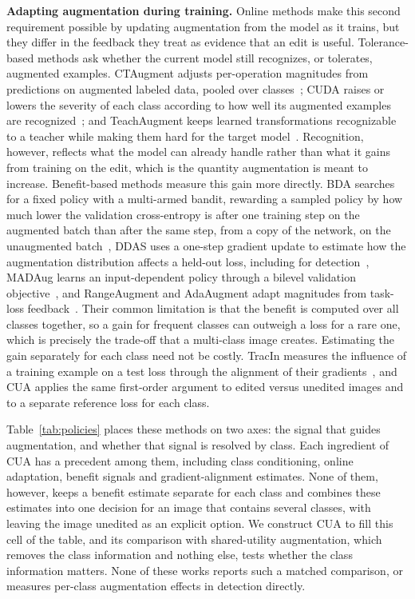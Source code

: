 \documentclass[conference]{IEEEtran}
\begin{document}
\noindent\textbf{Adapting augmentation during training.} Online methods make this second requirement possible by updating augmentation from the model as it trains, but they differ in the feedback they treat as evidence that an edit is useful. Tolerance-based methods ask whether the current model still recognizes, or tolerates, augmented examples. CTAugment adjusts per-operation magnitudes from predictions on augmented labeled data, pooled over classes~\cite{berthelot2020}; CUDA raises or lowers the severity of each class according to how well its augmented examples are recognized~\cite{ahn2023cuda}; and TeachAugment keeps learned transformations recognizable to a teacher while making them hard for the target model~\cite{suzuki2022teach}. Recognition, however, reflects what the model can already handle rather than what it gains from training on the edit, which is the quantity augmentation is meant to increase. Benefit-based methods measure this gain more directly. BDA searches for a fixed policy with a multi-armed bandit, rewarding a sampled policy by how much lower the validation cross-entropy is after one training step on the augmented batch than after the same step, from a copy of the network, on the unaugmented batch~\cite{lu2023bda}, DDAS uses a one-step gradient update to estimate how the augmentation distribution affects a held-out loss, including for detection~\cite{liu2021ddas}, MADAug learns an input-dependent policy through a bilevel validation objective~\cite{hou2023madaug}, and RangeAugment and AdaAugment adapt magnitudes from task-loss feedback~\cite{mehta2022rangeaugment,yang2025adaaugment}. Their common limitation is that the benefit is computed over all classes together, so a gain for frequent classes can outweigh a loss for a rare one, which is precisely the trade-off that a multi-class image creates. Estimating the gain separately for each class need not be costly. TracIn measures the influence of a training example on a test loss through the alignment of their gradients~\cite{pruthi2020tracin}, and CUA applies the same first-order argument to edited versus unedited images and to a separate reference loss for each class.

Table~\ref{tab:policies} places these methods on two axes: the signal that guides augmentation, and whether that signal is resolved by class. Each ingredient of CUA has a precedent among them, including class conditioning, online adaptation, benefit signals and gradient-alignment estimates. None of them, however, keeps a benefit estimate separate for each class and combines these estimates into one decision for an image that contains several classes, with leaving the image unedited as an explicit option. We construct CUA to fill this cell of the table, and its comparison with shared-utility augmentation, which removes the class information and nothing else, tests whether the class information matters. None of these works reports such a matched comparison, or measures per-class augmentation effects in detection directly.
\end{document}
